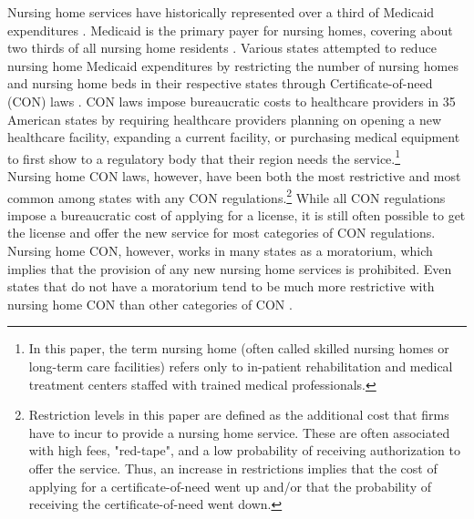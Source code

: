 \documentclass[../Main.tex]{subfiles}
\begin{document}
Nursing home services have historically represented over a third of Medicaid expenditures \citep{wiener1999controlling}. Medicaid is the primary payer for nursing homes, covering about two thirds of all nursing home residents . Various states attempted to reduce nursing home Medicaid expenditures by restricting the number of nursing homes and nursing home beds in their respective states through Certificate-of-need (CON) laws \citep{feder1980regulating,grabowski2003effects,rahman2016impact}. CON laws impose bureaucratic costs to healthcare providers in 35 American states by requiring healthcare providers planning on opening a new healthcare facility, expanding a current facility, or purchasing medical equipment to first show to a regulatory body that their region needs the service.\footnote{In this paper, the term nursing home (often called skilled nursing homes or long-term care facilities) refers only to in-patient rehabilitation and medical treatment centers staffed with trained medical professionals.}\\
\indent Nursing home CON laws, however, have been both the most restrictive and most common among states with any CON regulations.\footnote{Restriction levels in this paper are defined as the additional cost that firms have to incur to provide a nursing home service. These are often associated with high fees, "red-tape", and a low probability of receiving authorization to offer the service. Thus, an increase in restrictions implies that the cost of applying for a certificate-of-need went up and/or that the probability of receiving the certificate-of-need went down.} While all CON regulations impose a bureaucratic cost of applying for a license, it is still often possible to get the license and offer the new service for most categories of CON regulations.  Nursing home CON, however, works in many states as a moratorium, which implies that the provision of any new nursing home services is prohibited. Even states that do not have a moratorium tend to be much more restrictive with nursing home CON than other categories of CON \citep{american2020american}.\\
\end{document}

